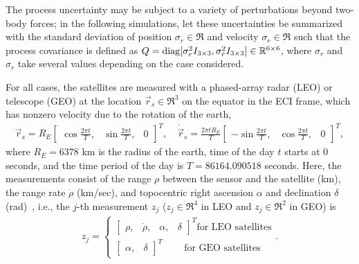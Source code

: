 The process uncertainty may be subject to a variety of perturbations beyond two-body forces; in the following simulations, let these uncertainties be summarized with the standard deviation of position $\sigma_r\in\Re$ and velocity $\sigma_{\dot r}\in\Re$ such that the process covariance is defined as $Q=\mathop{\mathrm{diag}}\nolimits[\sigma_r^2I_{3\times3}, \sigma_{\dot r}^2I_{3\times3}]\in\mathbb{R}^{6\times6}$, where $\sigma_r$ and $\sigma_{\dot r}$ take several values depending on the case considered.

For all cases, the satellites are measured with a phased-array radar (LEO) or telescope (GEO) at the location $\vec r_s\in\Re^3$ on the equator in the ECI frame, which has nonzero velocity due to the rotation of the earth,
\begin{align}
\vec r_s=R_E
\begin{bmatrix}
\cos\frac{2\pi t}T, & \sin\frac{2\pi t}T, & 0
\end{bmatrix}^T,
\quad
\dot{\vec r}_s=\frac{2\pi tR_E}T
\begin{bmatrix}
-\sin\frac{2\pi t}T,  & \cos\frac{2\pi t}T, & 0
\end{bmatrix}^T,
\end{align}
where $R_E=6378$ km is the radius of the earth, time of the day $t$ starts at $0$ seconds, and the time period of the day is $T=86164.090518$ seconds.
Here, the measurements consist of the range $\rho$ between the sensor and the satellite (km), the range rate $\dot\rho$ (km/sec), and topocentric right ascension $\alpha$ and declination $\delta$ (rad)~\cite{Val01}, i.e., the $j$-th measurement $z_j$ ($z_j\in\Re^4$ in LEO and $z_j\in\Re^2$ in GEO) is
\begin{align}
\label{eqn:zj}
z_j=\begin{cases}
                        \begin{bmatrix}\rho, & \dot\rho, & \alpha, & \delta\end{bmatrix}^T \text{for LEO satellites} \\
                        \begin{bmatrix}\alpha, & \delta\end{bmatrix}^T \qquad\  \text{for GEO satellites}
                    \end{cases}
.
\end{align}


